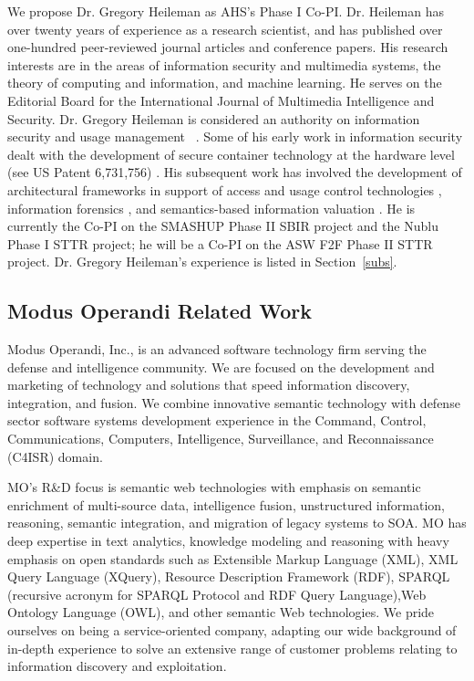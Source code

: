 \documentclass{sbir}
\begin{document}
We propose Dr. Gregory Heileman as AHS's Phase I Co-PI. Dr. Heileman has over twenty years of experience as a research scientist, and has published over one-hundred peer-reviewed journal articles and conference papers. His research interests are in the areas of information security and multimedia systems, the theory of computing and information, and machine learning. He serves on the Editorial Board for the International Journal of Multimedia Intelligence and Security. Dr. Gregory Heileman is considered an authority on information security and usage management ~\cite{Informatics}. Some of his early work in information security dealt with the development of secure container technology at the hardware level (see US Patent 6,731,756) \cite{PiHe:04}. His subsequent work has involved the development of architectural frameworks in support of access and usage control technologies \cite{HeJa:05,HeJaKhHr:07,JaHe:04,JaHeMa:06}, information forensics \cite{PeHeAb:07,QuPeHe:09}, and semantics-based information valuation \cite{AlHe:10,AlHe:08}. He is currently the Co-PI on the SMASHUP Phase II SBIR project and the Nublu Phase I STTR project; he will be a Co-PI on the ASW F2F Phase II STTR project. Dr. Gregory Heileman's experience is listed in Section~\ref{subs}.

\subsection{Modus Operandi Related Work}
Modus Operandi, Inc., is an advanced software technology firm serving the defense and intelligence community. We are focused on the development and marketing of technology and solutions that speed information discovery, integration, and fusion. We combine innovative semantic technology with defense sector software systems development experience in the Command, Control, Communications, Computers, Intelligence, Surveillance, and Reconnaissance (C4ISR) domain.

MO's R\&D focus is semantic web technologies with emphasis on semantic enrichment of multi-source data, intelligence fusion, unstructured information, reasoning, semantic integration, and migration of legacy systems to SOA. MO has deep expertise in text analytics, knowledge modeling and reasoning with heavy emphasis on open standards such as Extensible Markup Language (XML), XML Query Language (XQuery), Resource Description Framework (RDF), SPARQL (recursive acronym for SPARQL Protocol and RDF Query Language),Web Ontology Language (OWL), and other semantic Web technologies. We pride ourselves on being a service-oriented company, adapting our wide background of in-depth experience to solve an extensive range of customer problems relating to information discovery and exploitation.
\end{document}

